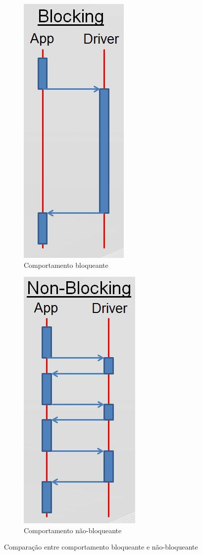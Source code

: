 \documentclass[11pt]{article}
\begin{document}
\begin{figure}[t]
\centering
\begin{subfigure}[b]{.5\textwidth}
  \centering
  \includegraphics[width=.4\linewidth]{BlockingSequence}
  \caption{Comportamento bloqueante}
  \label{fig:sub1}
\end{subfigure}%
\begin{subfigure}[b]{.5\textwidth}
  \centering
  \includegraphics[width=.4\linewidth]{NonBlockingSequence}
  \caption{Comportamento não-bloqueante}
  \label{fig:sub2}
\end{subfigure}
\caption{Comparação entre comportamento bloqueante e não-bloqueante}
\label{fig:test}
\end{figure}
\end{document}
